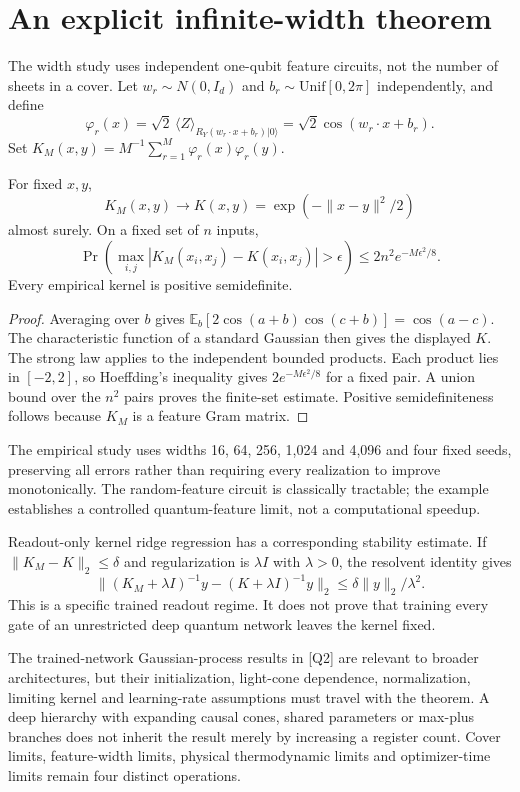 \section{An explicit infinite-width theorem}

The width study uses independent one-qubit feature circuits, not the number of sheets in a cover. Let $w_r\sim N(0,I_d)$ and $b_r\sim\mathrm{Unif}[0,2\pi]$ independently, and define
\[
 \varphi_r(x)=\sqrt2\,\langle Z\rangle_{R_Y(w_r\cdot x+b_r)|0\rangle}
 =\sqrt2\cos(w_r\cdot x+b_r).
\]
Set $K_M(x,y)=M^{-1}\sum_{r=1}^M\varphi_r(x)\varphi_r(y)$.

\begin{theorem}
For fixed $x,y$,
\[
 K_M(x,y)\longrightarrow
 K(x,y)=\exp(-\|x-y\|^2/2)
\]
almost surely. On a fixed set of $n$ inputs,
\[
 \Pr\!\left(\max_{i,j}|K_M(x_i,x_j)-K(x_i,x_j)|>\epsilon\right)
 \le2n^2e^{-M\epsilon^2/8}.
\]
Every empirical kernel is positive semidefinite.
\end{theorem}
\begin{proof}
Averaging over $b$ gives $\mathbb E_b[2\cos(a+b)\cos(c+b)]=\cos(a-c)$. The characteristic function of a standard Gaussian then gives the displayed $K$. The strong law applies to the independent bounded products. Each product lies in $[-2,2]$, so Hoeffding's inequality gives $2e^{-M\epsilon^2/8}$ for a fixed pair. A union bound over the $n^2$ pairs proves the finite-set estimate. Positive semidefiniteness follows because $K_M$ is a feature Gram matrix.
\end{proof}

The empirical study uses widths 16, 64, 256, 1,024 and 4,096 and four fixed seeds, preserving all errors rather than requiring every realization to improve monotonically. The random-feature circuit is classically tractable; the example establishes a controlled quantum-feature limit, not a computational speedup.

Readout-only kernel ridge regression has a corresponding stability estimate. If $\|K_M-K\|_2\le\delta$ and regularization is $\lambda I$ with $\lambda>0$, the resolvent identity gives
\[
 \|(K_M+\lambda I)^{-1}y-(K+\lambda I)^{-1}y\|_2
 \le\delta\|y\|_2/\lambda^2.
\]
This is a specific trained readout regime. It does not prove that training every gate of an unrestricted deep quantum network leaves the kernel fixed.

The trained-network Gaussian-process results in [Q2] are relevant to broader architectures, but their initialization, light-cone dependence, normalization, limiting kernel and learning-rate assumptions must travel with the theorem. A deep hierarchy with expanding causal cones, shared parameters or max-plus branches does not inherit the result merely by increasing a register count. Cover limits, feature-width limits, physical thermodynamic limits and optimizer-time limits remain four distinct operations.
